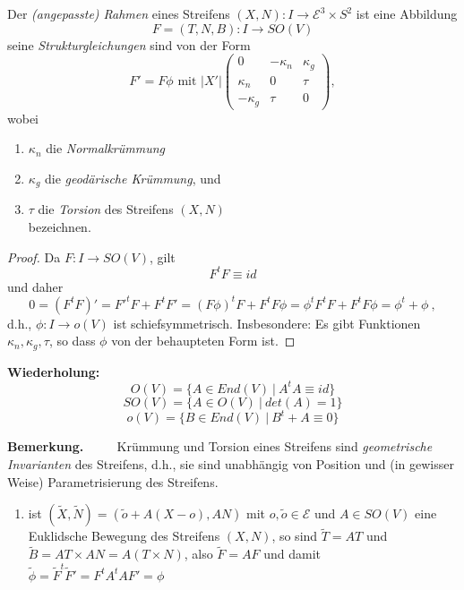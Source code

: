 \documentclass[a4paper,oneside,11pt,DIV=12,parskip=half]{scrartcl}
\newcommand{\E}{\mathcal E}
\newenvironment{note}{\textbf{Bemerkung.} ~~~~}{}
\newenvironment{lemma, definition}{\textbf{Lemma und Definition.} ~~~~}{}
\newenvironment{note, example}{\textbf{Bemerkung und Beispiel.} ~~~~}{}
\newenvironment{note, definition}{\textbf{Bemerkung und Definition.} ~~~~}{}
\begin{document}
\begin{lemma, definition}
	
	Der \textit{ (angepasste) Rahmen} eines Streifens $(X,N): I\rightarrow\E^3\times S^2$ ist eine Abbildung \[ F=(T,N,B): I\rightarrow SO(V) \] seine \textit{Strukturgleichungen} sind von der Form \[ F' = F \phi \text{ mit } |X'| \begin{pmatrix}
	0 & - \kappa_n & \kappa_g \\
	\kappa_n & 0 & \tau\\
	-\kappa_g & \tau & 0
	\end{pmatrix}, \] wobei\begin{enumerate}
		\item $\kappa_n$ die \textit{Normalkrümmung}
		\item $\kappa_g$ die \textit{geodärische Krümmung}, und
		\item $\tau$ die \textit{Torsion} des Streifens $(X,N)$ \\ bezeichnen.
		
	\end{enumerate}

\begin{proof}
	Da $F: I \rightarrow SO(V)$, gilt \[F^tF \equiv id\] und daher \[ 0 = (F^tF)' = F'^tF + F^tF' = (F\phi)^tF + F^tF\phi = \phi^tF^tF + F^tF\phi = \phi^t+ \phi  ~,\] d.h., $\phi:I \rightarrow o(V)$ ist schiefsymmetrisch. Insbesondere: Es gibt Funktionen $\kappa_n, \kappa_g, \tau$, so dass $\phi$ von der behaupteten Form ist.
\end{proof}

\textbf{Wiederholung:}
$$O(V) = \{ A \in End(V) ~ | ~ A^tA\equiv id \}$$
$$SO(V) = \{ A \in O(V) ~ | ~ det(A) = 1 \}$$
$$o(V) = \{ B \in End(V) ~ | ~ B^t +A\equiv 0 \}$$

\begin{note}
	Krümmung und Torsion eines Streifens sind \textit{geometrische Invarianten} des Streifens, d.h., sie sind unabhängig von Position und (in gewisser Weise) Parametrisierung des Streifens.
	
	\begin{enumerate}
		\item ist $(\widetilde{X}, \widetilde{N}) = (\widetilde{o} + A(X-o), AN)$ mit $o,\widetilde{o} \in \E$ und $A \in SO(V)$ eine Euklidsche Bewegung des Streifens $(X,N)$, so sind $\widetilde{T}= AT$ und $\widetilde{B}= AT\times AN = A(T\times N)$, also $\widetilde{F}=AF$ und damit $\widetilde{\phi} = \widetilde{F}^t\widetilde{F}'= F^tA^tAF' = \phi$
		

\end{enumerate}
\end{note}
\end{lemma, definition}
\end{document}
